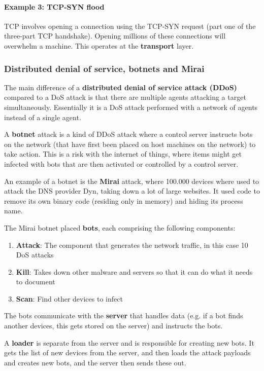 \paragraph{Example 3: TCP-SYN flood} TCP involves opening a connection using the TCP-SYN request (part one of the three-part TCP handshake). Opening millions of these connections will overwhelm a machine. This operates at the \textbf{transport} layer.

\subsubsection{Distributed denial of service, botnets and Mirai}

The main difference of a \textbf{distributed denial of service attack (DDoS)} compared to a DoS attack is that there are multiple agents attacking a target simultaneously. Essentially it is a DoS attack performed with a network of agents instead of a single agent.

A \textbf{botnet} attack is a kind of DDoS attack where a control server instructs bots on the network (that have first been placed on host machines on the network) to take action. This is a risk with the internet of things, where items might get infected with bots that are then activated or controlled by a control server.

An example of a botnet is the \textbf{Mirai} attack, where 100.000 devices where used to attack the DNS provider Dyn, taking down a lot of large websites. It used code to remove its own binary code (residing only in memory) and hiding its process name.

The Mirai botnet placed \textbf{bots}, each comprising the following components:

\begin{enumerate}
    \item \textbf{Attack}: The component that generates the network traffic, in this case 10 DoS attacks
    \item \textbf{Kill}: Takes down other malware and servers so that it can do what it needs to document
    \item \textbf{Scan}: Find other devices to infect  
\end{enumerate}

The bots communicate with the \textbf{server} that handles data (e.g. if a bot finds another devices, this gets stored on the server) and instructs the bots.

A \textbf{loader} is separate from the server and is responsible for creating new bots. It gets the list of new devices from the server, and then loads the attack payloads and creates new bots, and the server then sends these out.

